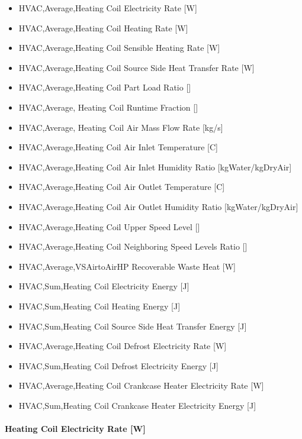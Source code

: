 \begin{itemize}
\item
  HVAC,Average,Heating Coil Electricity Rate {[}W{]}
\item
  HVAC,Average,Heating Coil Heating Rate {[}W{]}
\item
  HVAC,Average,Heating Coil Sensible Heating Rate {[}W{]}
\item
  HVAC,Average,Heating Coil Source Side Heat Transfer Rate {[}W{]}
\item
  HVAC,Average,Heating Coil Part Load Ratio {[]}
\item
  HVAC,Average, Heating Coil Runtime Fraction {[]}
\item
  HVAC,Average, Heating Coil Air Mass Flow Rate {[}kg/s{]}
\item
  HVAC,Average,Heating Coil Air Inlet Temperature {[}C{]}
\item
  HVAC,Average,Heating Coil Air Inlet Humidity Ratio {[}kgWater/kgDryAir{]}
\item
  HVAC,Average,Heating Coil Air Outlet Temperature {[}C{]}
\item
  HVAC,Average,Heating Coil Air Outlet Humidity Ratio {[}kgWater/kgDryAir{]}
\item
  HVAC,Average,Heating Coil Upper Speed Level {[]}
\item
  HVAC,Average,Heating Coil Neighboring Speed Levels Ratio {[]}
\item
  HVAC,Average,VSAirtoAirHP Recoverable Waste Heat {[}W{]}
\item
  HVAC,Sum,Heating Coil Electricity Energy {[}J{]}
\item
  HVAC,Sum,Heating Coil Heating Energy {[}J{]}
\item
  HVAC,Sum,Heating Coil Source Side Heat Transfer Energy {[}J{]}
\item
  HVAC,Average,Heating Coil Defrost Electricity Rate {[}W{]}
\item
  HVAC,Sum,Heating Coil Defrost Electricity Energy {[}J{]}
\item
  HVAC,Average,Heating Coil Crankcase Heater Electricity Rate {[}W{]}
\item
  HVAC,Sum,Heating Coil Crankcase Heater Electricity Energy {[}J{]}
\end{itemize}

\paragraph{Heating Coil Electricity Rate {[}W{]}}\label{heating-coil-electric-power-w-6}

